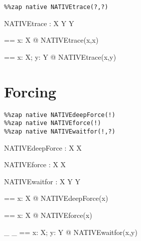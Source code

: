 \documentclass{article}
\begin{document}
\begin{verbatim}
%%zap native NATIVEtrace(?,?)
\end{verbatim}

\begin{axdef}[X,Y]
  NATIVEtrace : \assumed X \cross Y \fun Y
\end{axdef}

\begin{axdef}[X]
  \TRACE == \lambda x: \assumed X @ NATIVEtrace(x,x)
\end{axdef}

\begin{axdef}[X,Y]
  \PRINT == \lambda x: \assumed X; y: \assumed Y @ NATIVEtrace(x,y)
\end{axdef}


\section{Forcing}

\begin{verbatim}
%%zap native NATIVEdeepForce(!)
%%zap native NATIVEforce(!)
%%zap native NATIVEwaitfor(!,?)
\end{verbatim}

\begin{axdef}[X]
  NATIVEdeepForce : \assumed X \fun X
\end{axdef}

\begin{axdef}[X]
  NATIVEforce : \assumed X \fun X
\end{axdef}

\begin{axdef}[X,Y]
  NATIVEwaitfor : \assumed X \cross Y \fun Y
\end{axdef}



\begin{axdef}[X]
  \DEEPFORCE == \lambda x: \assumed X @ NATIVEdeepForce(x)
\end{axdef}

\begin{axdef}[X]
  \FORCE == \lambda x: \assumed X @ NATIVEforce(x)
\end{axdef}


\begin{axdef}[X,Y]
  \_ \whenbound \_ == \lambda x: \assumed X; y: \assumed Y @ NATIVEwaitfor(x,y)
\end{axdef}
\end{document}
